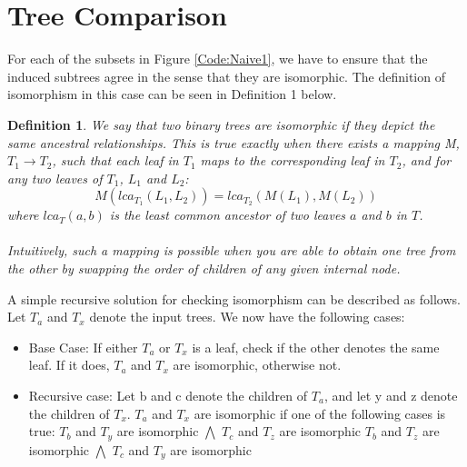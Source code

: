 \section{Tree Comparison}
For each of the subsets in Figure \ref{Code:Naive1}, we have to ensure that the induced subtrees agree in the sense that they are isomorphic. The definition of isomorphism in this case can be seen in Definition 1 below.

\newtheorem{definition}{Definition}
\begin{definition}
	We say that two binary trees are isomorphic if they depict the same ancestral relationships. This is true exactly when there exists a mapping M, $T_1 \rightarrow T_2$, such that each leaf in $T_1$ maps to the corresponding leaf in $T_2$, and for any two leaves of $T_1$, $L_1$ and $L_2$:  
	\begin{equation*}
		M(lca_{T_1}(L_{1}, L_{2})) = lca_{T_2}(M(L_{1}), M(L_{2}))
	\end{equation*} 
	where $lca_T(a, b)$ is the least common ancestor of two leaves $a$ and $b$ in $T$. \\
	\\
	Intuitively, such a mapping is possible when you are able to obtain one tree from the other by swapping the order of children of any given internal node. \\
\end{definition}

A simple recursive solution for checking isomorphism can be described as follows. Let $T_a$ and $T_x$ denote the input trees. We now have the following cases:
\begin{itemize}
	\item Base Case: If either $T_a$ or $T_x$ is a leaf, check if the other denotes the same leaf. If it does, $T_a$ and $T_x$ are isomorphic, otherwise not.
	\item Recursive case: Let b and c denote the children of $T_a$, and let y and z denote the children of $T_x$. $T_a$ and $T_x$ are isomorphic if one of the following cases is true:
	\subitem $T_b$ and $T_y$ are isomorphic $\bigwedge$ $T_c$ and $T_z$ are isomorphic
	\subitem $T_b$ and $T_z$ are isomorphic $\bigwedge$ $T_c$ and $T_y$ are isomorphic
\end{itemize}






